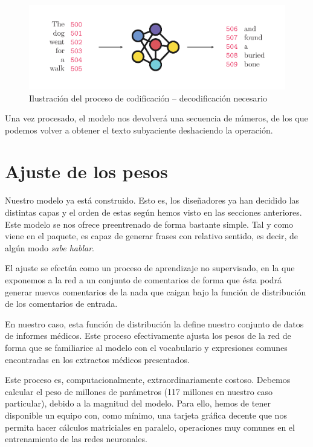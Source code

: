 \begin{figure}[h]
	\centering
	\includegraphics[width=.9\textwidth]{media/tokenizer.pdf}
	\caption{Ilustración del proceso de codificación -- decodificación necesario}
	\label{fig:codification}
\end{figure}

Una vez procesado, el modelo nos devolverá una secuencia de números, de los que podemos volver a obtener el texto subyaciente deshaciendo la operación.




\section{Ajuste de los pesos}
Nuestro modelo ya está construido. Esto es, los diseñadores ya han decidido las distintas capas y el orden de estas según hemos visto en las secciones anteriores. Este modelo se nos ofrece preentrenado de forma bastante simple. Tal y como viene en el paquete, es capaz de generar frases con relativo sentido, es decir, de algún modo \textit{sabe hablar}. 

El ajuste se efectúa como un proceso de aprendizaje no supervisado, en la que exponemos a la red a un conjunto de comentarios de forma que ésta podrá generar nuevos comentarios de la nada que caigan bajo la función de distribución de los comentarios de entrada. 

En nuestro caso, esta función de distribución la define nuestro conjunto de datos de informes médicos. Este proceso efectivamente ajusta los pesos de la red de forma que se familiarice al modelo con el vocabulario y expresiones comunes encontradas en los extractos médicos presentados.

Este proceso es, computacionalmente, extraordinariamente costoso. Debemos calcular el peso de millones de parámetros (117 millones en nuestro caso particular), debido a la magnitud del modelo. Para ello, hemos de tener disponible un equipo con, como mínimo, una tarjeta gráfica decente que nos permita hacer cálculos matriciales en paralelo, operaciones muy comunes en el entrenamiento de las redes neuronales.

